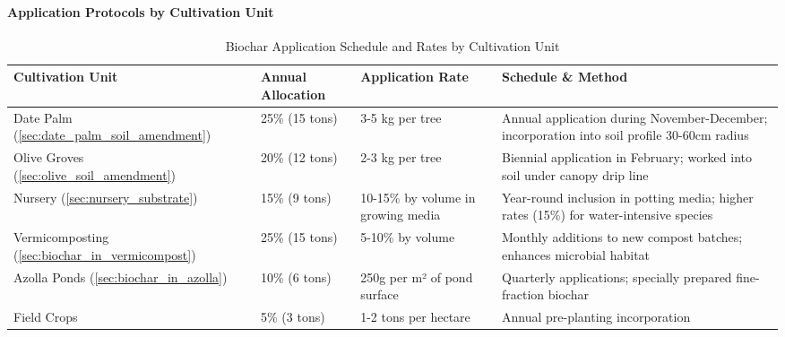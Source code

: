 \paragraph{Application Protocols by Cultivation Unit}
\label{sec:biochar_application}
\begin{table}[h]
\centering
\caption{Biochar Application Schedule and Rates by Cultivation Unit}
\label{tab:biochar_application}
\begin{tabular}{|p{2.5cm}|p{2cm}|p{2.5cm}|p{5cm}|}
\hline
\textbf{Cultivation Unit} & \textbf{Annual Allocation} & \textbf{Application Rate} & \textbf{Schedule \& Method} \\
\hline
Date Palm (\ref{sec:date_palm_soil_amendment}) & 25\% (15 tons) & 3-5 kg per tree & Annual application during November-December; incorporation into soil profile 30-60cm radius \\
\hline
Olive Groves (\ref{sec:olive_soil_amendment}) & 20\% (12 tons) & 2-3 kg per tree & Biennial application in February; worked into soil under canopy drip line \\
\hline
Nursery (\ref{sec:nursery_substrate}) & 15\% (9 tons) & 10-15\% by volume in growing media & Year-round inclusion in potting media; higher rates (15\%) for water-intensive species \\
\hline
Vermicomposting (\ref{sec:biochar_in_vermicompost}) & 25\% (15 tons) & 5-10\% by volume & Monthly additions to new compost batches; enhances microbial habitat \\
\hline
Azolla Ponds (\ref{sec:biochar_in_azolla}) & 10\% (6 tons) & 250g per m² of pond surface & Quarterly applications; specially prepared fine-fraction biochar \\
\hline
Field Crops & 5\% (3 tons) & 1-2 tons per hectare & Annual pre-planting incorporation \\
\hline
\end{tabular}
\end{table}

